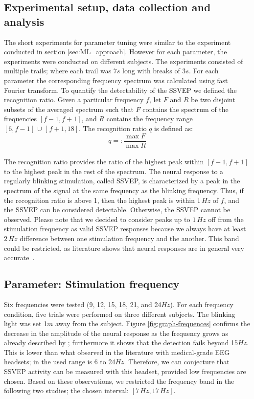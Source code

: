 \documentclass{svmult}
\begin{document}
\subsection{Experimental setup, data collection and analysis}
The short experiments for parameter tuning were similar to the experiment conducted in section \ref{sec:ML_approach}. However for each parameter, the experiments were conducted on different subjects. The experiments consisted of multiple trails; where each trail was 7$s$ long with breaks of 3$s$. For each parameter the corresponding frequency spectrum was calculated using fast Fourier transform. To quantify the detectability of the SSVEP we defined the recognition ratio. Given a particular frequency $f$, let $F$ and $R$ be two disjoint subsets of the averaged spectrum such that $F$ contains the spectrum of the frequencies $[f-1, f+1]$, and $R$ contains the frequency range $[6, f-1[ \,\cup\, ]f+1, 18]$. The recognition ratio $q$ is defined as:
\begin{equation}
\label{recog_rat}
q =:\frac{\max F}{\max R}
\end{equation}
\\
The recognition ratio provides the ratio of the highest peak within $[f-1, f+1]$ to the highest peak in the rest of the spectrum. The neural response to a regularly blinking stimulation, called SSVEP, is characterized by a peak in the spectrum of the signal at the same frequency as the blinking frequency. Thus, if the recognition ratio is above 1, then the highest peak is within $1\,\mathit{Hz}$ of $f$, and the SSVEP can be considered detectable. 
Otherwise, the SSVEP cannot be observed. 
Please note that we decided to consider peaks up to $1\,\mathit{Hz}$ off from the stimulation frequency as valid SSVEP responses because we always have at least $2\,\mathit{Hz}$ difference between one stimulation frequency and the another. This band could be restricted, as literature shows that neural responses are in general very accurate~\cite{SSVEPfiability}.

\subsection{Parameter: Stimulation frequency}
Six frequencies were tested (9, 12, 15, 18, 21, and 24$Hz$). For each frequency condition, five trials were performed on three different subjects. The blinking light was set 1$m$ away from the subject. Figure \ref{fig:graph-frequences} confirms the decrease in the amplitude of the neural response as the frequency grows as already described by \cite{herrmann2001}; furthermore it shows that the detection fails beyond 15$Hz$. This is lower than what observed in the literature with medical-grade EEG headsets; in \cite{SSVEPfiability} the used range is 6 to 24$Hz$. Therefore, we can conjecture that SSVEP activity can be measured with this headset, provided low frequencies are chosen. Based on these observations, we restricted the frequency band in the following two studies; the chosen interval: $[7\,\mathit{Hz}, 17\,\mathit{Hz}]$.
\end{document}
